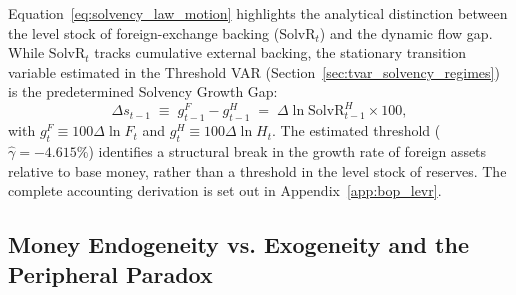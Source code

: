 Equation~\ref{eq:solvency_law_motion} highlights the analytical distinction between the level stock of foreign-exchange backing ($\text{SolvR}_t$) and the dynamic flow gap. While $\text{SolvR}_t$ tracks cumulative external backing, the stationary transition variable estimated in the Threshold VAR (Section~\ref{sec:tvar_solvency_regimes}) is the predetermined Solvency Growth Gap:
\begin{equation}
	\Delta s_{t-1} \;\equiv\; g^F_{t-1} - g^H_{t-1} \;=\; \Delta \ln \text{SolvR}^H_{t-1} \times 100,
	\label{eq:solvency_growth_gap_def}
\end{equation}
with $g^F_t \equiv 100 \Delta \ln F_t$ and $g^H_t \equiv 100 \Delta \ln H_t$. The estimated threshold ($\hat{\gamma} = -4.615\%$) identifies a structural break in the growth rate of foreign assets relative to base money, rather than a threshold in the level stock of reserves. The complete accounting derivation is set out in Appendix~\ref{app:bop_levr}.

\subsection{Money Endogeneity vs. Exogeneity and the Peripheral Paradox}
\label{sec:B4_money_endogeneity_paradox}
\label{sec:money_endogeneity_paradox}

